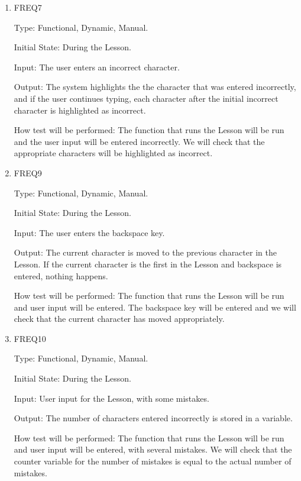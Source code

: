 \documentclass[12pt, titlepage]{article}
\begin{document}
\begin{enumerate}

\item{FREQ7\\}

Type: Functional, Dynamic, Manual.
					
Initial State: During the Lesson.
					
Input: The user enters an incorrect character.
					
Output: The system highlights the the character that was entered incorrectly, and if the user continues typing, each character after the initial incorrect character is highlighted as incorrect.
					
How test will be performed: The function that runs the Lesson will be run and the user input will be entered incorrectly. We will check that the appropriate characters will be highlighted as incorrect.

\item{FREQ9\\}

Type: Functional, Dynamic, Manual.
					
Initial State: During the Lesson.
					
Input: The user enters the backspace key.
					
Output: The current character is moved to the previous character in the Lesson. If the current character is the first in the Lesson and backspace is entered, nothing happens.
					
How test will be performed: The function that runs the Lesson will be run and user input will be entered. The backspace key will be entered and we will check that the current character has moved appropriately.

\item{FREQ10\\}

Type: Functional, Dynamic, Manual.
					
Initial State: During the Lesson.
					
Input: User input for the Lesson, with some mistakes.
					
Output: The number of characters entered incorrectly is stored in a variable.
					
How test will be performed: The function that runs the Lesson will be run and user input will be entered, with several mistakes. We will check that the counter variable for the number of mistakes is equal to the actual number of mistakes.
\end{enumerate}
\end{document}

